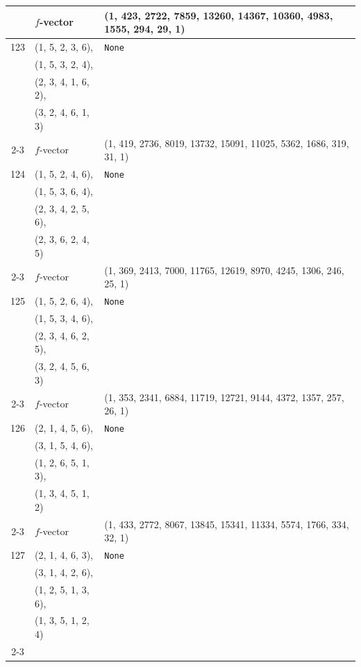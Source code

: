 \documentclass[10pt]{amsart}
\numberwithin{equation}{section}
\theoremstyle{plain}
\theoremstyle{definition}
\theoremstyle{remark}
\begin{document}
{\begin{longtable}{c|l|l}
		& $f$-vector & {(1, 423, 2722, 7859, 13260, 14367, 10360, 4983, 1555, 294, 29, 1)} \\
		\midrule
		
		123 & (1, 5, 2, 3, 6), & \texttt{None} \\
		& (1, 5, 3, 2, 4), &  \\
		& (2, 3, 4, 1, 6, 2), &  \\
		& (3, 2, 4, 6, 1, 3) &  \\ \cline{2-3}
		
		& $f$-vector & {(1, 419, 2736, 8019, 13732, 15091, 11025, 5362, 1686, 319, 31, 1)} \\
		\midrule
		
		124 & (1, 5, 2, 4, 6), & \texttt{None} \\
		& (1, 5, 3, 6, 4), &  \\
		& (2, 3, 4, 2, 5, 6), &  \\
		& (2, 3, 6, 2, 4, 5) &  \\ \cline{2-3}
		
		& $f$-vector & {(1, 369, 2413, 7000, 11765, 12619, 8970, 4245, 1306, 246, 25, 1)} \\
		\midrule
		
		125 & (1, 5, 2, 6, 4), & \texttt{None} \\
		& (1, 5, 3, 4, 6), &  \\
		& (2, 3, 4, 6, 2, 5), &  \\
		& (3, 2, 4, 5, 6, 3) &  \\ \cline{2-3}
		
		& $f$-vector & {(1, 353, 2341, 6884, 11719, 12721, 9144, 4372, 1357, 257, 26, 1)} \\
		\midrule
		
		126 & (2, 1, 4, 5, 6), & \texttt{None} \\
		& (3, 1, 5, 4, 6), &  \\
		& (1, 2, 6, 5, 1, 3), &  \\
		& (1, 3, 4, 5, 1, 2) &  \\ \cline{2-3}
		
		& $f$-vector & {(1, 433, 2772, 8067, 13845, 15341, 11334, 5574, 1766, 334, 32, 1)} \\
		\midrule
		
		127 & (2, 1, 4, 6, 3), & \texttt{None} \\
		& (3, 1, 4, 2, 6), &  \\
		& (1, 2, 5, 1, 3, 6), &  \\
		& (1, 3, 5, 1, 2, 4) &  \\ \cline{2-3}
		

\end{longtable}}
\end{document}
